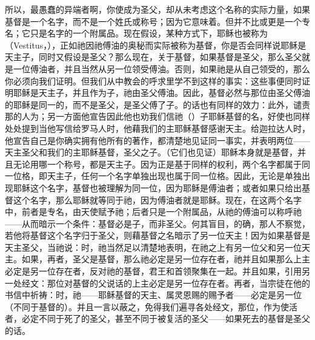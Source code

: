 所以，最愚蠢的异端者啊，你使成为圣父，却从未考虑这个名称的实际力量，如果基督是一个名字，而不是一个姓氏或称号；因为它意味着。但并不比或更是一个专名；它只是名字的一个附属品。现在假设，某种方式下，耶稣也被称为（Vestitus，），正如祂因祂傅油的奥秘而实际被称为基督，你是否会同样说耶稣是天主子，同时又假设是圣父？那么现在，关于基督，如果基督是圣父，那么圣父就是一位傅油者，并且当然从另一位领受傅油。否则，如果祂是从自己领受的，那么你必须向我们证明。但我们从中教会的呼求里学不到这样的事实：这些事便同时证明耶稣是天主子，并且作为子，祂由圣父傅油。因此，基督必然与那位由圣父傅油的耶稣是同一的，而不是圣父，是圣父傅了子。的话也有同样的效力：此外，谴责那的人为；另一方面他宣告因此他也劝我们信祂（）子耶稣基督的名，好使也同样处处提到当他写信给罗马人时，他藉我们的主耶稣基督感谢天主。给迦拉达人时，他宣告自己是你确实拥有他所有的著作，都清楚地见证同一事实，并表明两位——天主圣父和我们的主耶稣基督，圣父之子。（它们也见证）耶稣本身就是基督，并且无论用哪一个称号，都是天主子。因为正是基于同样的权利，两个名字都属于同一位格，即天主子，任何一个名字单独出现也属于同一位格。因此，无论是单独出现耶稣这个名字，基督也被理解为同一位，因为耶稣是傅油者；或者如果只给出基督这个名字，那么耶稣就等同于祂，因为傅油者就是耶稣。现在，在这两个名字中，前者是专名，由天使赋予祂；后者只是一个附属品，从祂的傅油可以称呼祂——从而暗示一个条件：基督必是子，而非圣父。何其盲目，的确，那人不察觉，若他将基督这个名字归于圣父，则藉基督之名暗示了另一位天主！因为如果基督是天主圣父，当祂说：时，祂当然足以清楚地表明，在祂之上有另一位父和另一位天主。如果，再者，圣父是基督，那么祂必定是另一位存在者，祂并且如果那么上主必定是另一位存在者，反对祂的基督，君王和首领聚集在一起。并且如果，引用另一处经文：那位对基督的父说话的上主必定是另一位存在者。再者，当宗徒在他的书信中祈祷：时，祂——耶稣基督的天主、属灵恩赐的赐予者——必定是另一位（不同于基督的）。并且一言以蔽之，免得我们遍寻各处经文，那位，作为使活者，必定不同于死了的圣父，甚至不同于被复活的圣父——如果死去的基督是圣父的话。\par

